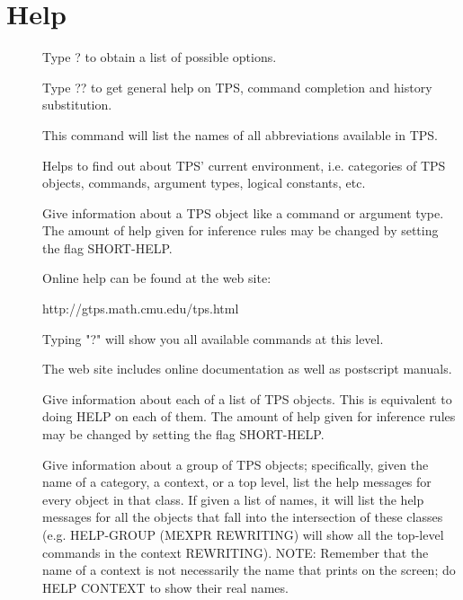 \section{Help}

\begin{description} 
\item[\parbox{\textwidth}{?}]  
Type ? to obtain a list of possible options.

\item[\parbox{\textwidth}{??}]  
Type ?? to get general help on TPS, command completion
and history substitution.

\item[\parbox{\textwidth}{ABBREVIATIONS \textit{show-defns}}]  
This command will list the names of all abbreviations available in TPS.

\item[\parbox{\textwidth}{ENVIRONMENT}]  
Helps to find out about TPS' current environment, i.e.
categories of TPS objects, commands, argument types, logical constants, etc.

\item[\parbox{\textwidth}{HELP \textit{keyword}}]  
Give information about a TPS object like a command or argument type.
The amount of help given for inference rules may be changed by setting the
flag SHORT-HELP.

Online help can be found at the web site:
 
http://gtps.math.cmu.edu/tps.html

Typing "?" will show you all available commands at this level.

The web site includes online documentation as well
as postscript manuals.

\item[\parbox{\textwidth}{HELP* \textit{keywords}}]  
Give information about each of a list of TPS objects.
This is equivalent to doing HELP on each of them.
The amount of help given for inference rules may be changed by setting the
flag SHORT-HELP.

\item[\parbox{\textwidth}{HELP-GROUP \textit{keywords}}]  
Give information about a group of TPS objects; specifically,
given the name of a category, a context, or a top level, 
list the help messages for every object in that class.
If given a list of names, it will list the help messages
for all the objects that fall into the intersection of these
classes (e.g. HELP-GROUP (MEXPR REWRITING) will show all the 
top-level commands in the context REWRITING).
NOTE: Remember that the name of a context is not necessarily
the name that prints on the screen; do HELP CONTEXT
to show their real names.


\end{description}
